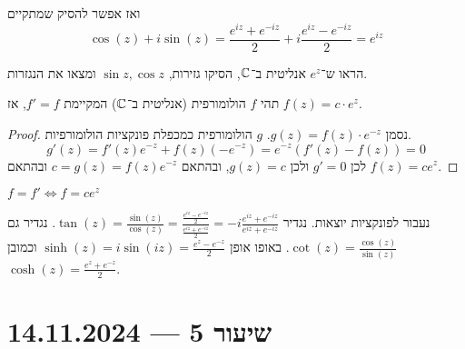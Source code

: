 ואז אפשר להסיק שמתקיים
\[
	\cos(z) + i \sin(z)
	= \frac{e^{iz} + e^{-iz}}{2}
	+ i \frac{e^{iz} - e^{-iz}}{2}
	= e^{iz}
\]
\begin{exercise}
	הראו ש־$e^z$ אנליטית ב־$\mathbb{C}$, הסיקו גזירות, $\sin z, \cos z$ ומצאו את הנגזרות.
\end{exercise}
\begin{proposition}
	תהי $f$ הולומורפית (אנליטית ב־$\mathbb{C}$) המקיימת $f' = f$, אז $f(z) = c \cdot e^z$.
\end{proposition}
\begin{proof}
	נסמן $g(z) = f(z) \cdot e^{-z}$.
	$g$ הולומורפית כמכפלת פונקציות הולומורפיות.
	\[
		g'(z) = f'(z) e^{-z} + f(z) (-e^{-z})
		= e^{-z} (f'(z) - f(z))
		= 0
	\]
	לכן $g' = 0$ ולכן $g(z) = c$, ובהתאם $c = g(z) = f(z) e^{-z}$ ובהתאם $f(z) = c e^z$.
\end{proof}
\begin{conclusion}
	$f = f' \iff f = ce^z$
\end{conclusion}
נעבור לפונקציות יוצאות.
נגדיר $\tan(z) = \frac{\sin(z)}{\cos(z)} = \frac{\frac{e^{iz} - e^{-iz}}{2}}{\frac{e^{iz} + e^{-iz}}{2}}= -i \frac{e^{iz} + e^{-iz}}{e^{iz} + e^{-iz}}$.
נגדיר גם $\cot(z) = \frac{\cos(z)}{\sin(z)}$.
באופו אופן $\sinh(z) = i \sin(iz) = \frac{e^z - e^{-z}}{2}$ וכמובן $\cosh(z) = \frac{e^z + e^{-z}}{2}$.

\section{שיעור 5 --- 14.11.2024}
